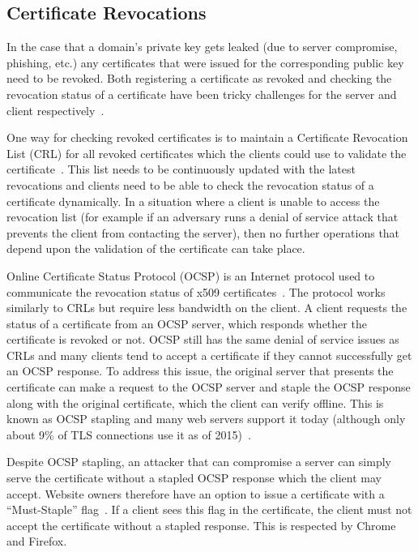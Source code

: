 \subsection{Certificate Revocations}
In the case that a domain's private key gets leaked (due to server compromise,
phishing, etc.) any certificates that were issued for the corresponding public
key need to be revoked. Both registering a certificate as revoked and checking
the revocation status of a certificate have been tricky challenges for the
server and client respectively~\cite{revocation-measurement}.

One way for checking revoked certificates is to maintain a Certificate
Revocation List (CRL) for all revoked certificates which the clients could use
to validate the certificate~\cite{RFC5280}. This list needs to be continuously
updated with the latest revocations and clients need to be able to check the
revocation status of a certificate dynamically. In a situation where a client
is unable to access the revocation list (for example if an adversary runs a
denial of service attack that prevents the client from contacting the server),
then no further operations that depend upon the validation of the certificate
can take place.

Online Certificate Status Protocol (OCSP) is an Internet protocol used to
communicate the revocation status of x509 certificates~\cite{RFC2560}. The
protocol works similarly to CRLs but require less bandwidth on the client. A
client requests the status of a certificate from an OCSP server, which responds
whether the certificate is revoked or not. OCSP still has the same denial of
service issues as CRLs and many clients tend to accept a certificate if they
cannot successfully get an OCSP response. To address this issue, the original
server that presents the certificate can make a request to the OCSP server and
staple the OCSP response along with the original certificate, which the client
can verify offline. This is known as OCSP stapling and many web servers support
it today (although only about 9\% of TLS connections use it as of
2015)~\cite{onecrl}.

Despite OCSP stapling, an attacker that can compromise a server can simply
serve the certificate without a stapled OCSP response which the client may
accept. Website owners therefore have an option to issue a certificate with a
``Must-Staple'' flag~\cite{must-staple}. If a client sees this flag in the
certificate, the client must not accept the certificate without a stapled
response. This is respected by Chrome and Firefox.

